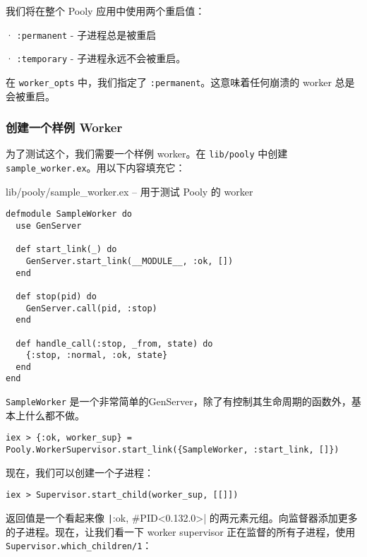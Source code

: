 我们将在整个 Pooly 应用中使用两个重启值：

· \texttt{:permanent} - 子进程总是被重启

· \texttt{:temporary} - 子进程永远不会被重启。

在 \texttt{worker\_opts} 中，我们指定了
\texttt{:permanent}。这意味着任何崩溃的 worker
总是会被重启。


\subsubsection{创建一个样例
Worker}

为了测试这个，我们需要一个样例 worker。在
\texttt{lib/pooly} 中创建
\texttt{sample\_worker.ex}。用以下内容填充它：

\begin{code}{lib/pooly/sample\_worker.ex -- 用于测试 Pooly 的 worker}

\begin{verbatim}
defmodule SampleWorker do
  use GenServer

  def start_link(_) do
    GenServer.start_link(__MODULE__, :ok, [])
  end

  def stop(pid) do
    GenServer.call(pid, :stop)
  end

  def handle_call(:stop, _from, state) do
    {:stop, :normal, :ok, state}
  end
end
\end{verbatim}
\label{lst:worker_to_test_supervisor}
\end{code}

\texttt{SampleWorker} 是一个非常简单的GenServer，除了有控制其生命周期的函数外，基本上什么都不做。

\begin{code}{}
\begin{verbatim}
iex > {:ok, worker_sup} = Pooly.WorkerSupervisor.start_link({SampleWorker, :start_link, []})
\end{verbatim}
\end{code}

现在，我们可以创建一个子进程：

\begin{code}{}
\begin{verbatim}
iex > Supervisor.start_child(worker_sup, [[]])
\end{verbatim}
\end{code}

返回值是一个看起来像 \texttt|{:ok, \#PID<0.132.0>}|
的两元素元组。向监督器添加更多的子进程。现在，让我们看一下 worker
supervisor 正在监督的所有子进程，使用
\texttt{Supervisor.which\_children/1}：

